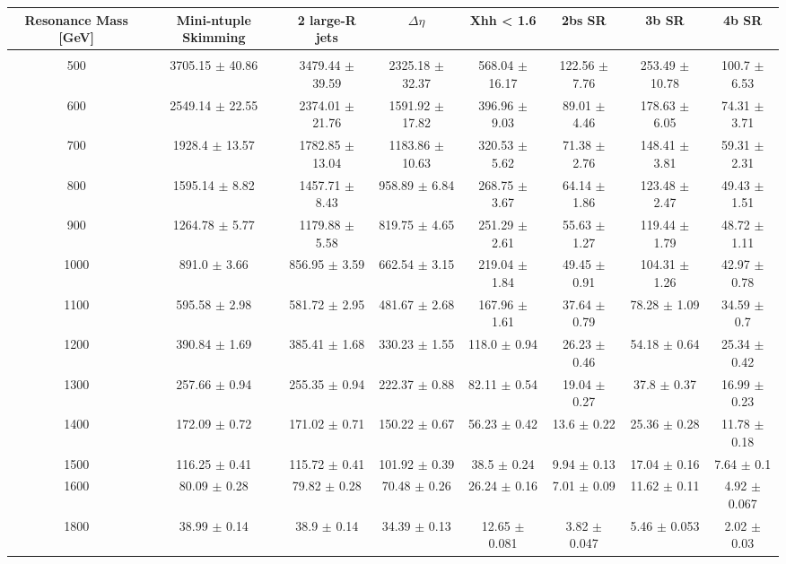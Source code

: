\begin{footnotesize} 
\begin{tabular}{c|c|c|c|c|c|c|c} 
Resonance Mass [GeV] & Mini-ntuple Skimming & 2 large-R jets & $\Delta\eta$ & Xhh < 1.6 & 2bs SR & 3b SR & 4b SR \\ 
\hline\hline 
& & & & & & &\\ 
500 & 3705.15 $\pm$ 40.86 & 3479.44 $\pm$ 39.59 & 2325.18 $\pm$ 32.37 & 568.04 $\pm$ 16.17 & 122.56 $\pm$ 7.76 & 253.49 $\pm$ 10.78 & 100.7 $\pm$ 6.53\\ 
600 & 2549.14 $\pm$ 22.55 & 2374.01 $\pm$ 21.76 & 1591.92 $\pm$ 17.82 & 396.96 $\pm$ 9.03 & 89.01 $\pm$ 4.46 & 178.63 $\pm$ 6.05 & 74.31 $\pm$ 3.71\\ 
700 & 1928.4 $\pm$ 13.57 & 1782.85 $\pm$ 13.04 & 1183.86 $\pm$ 10.63 & 320.53 $\pm$ 5.62 & 71.38 $\pm$ 2.76 & 148.41 $\pm$ 3.81 & 59.31 $\pm$ 2.31\\ 
800 & 1595.14 $\pm$ 8.82 & 1457.71 $\pm$ 8.43 & 958.89 $\pm$ 6.84 & 268.75 $\pm$ 3.67 & 64.14 $\pm$ 1.86 & 123.48 $\pm$ 2.47 & 49.43 $\pm$ 1.51\\ 
900 & 1264.78 $\pm$ 5.77 & 1179.88 $\pm$ 5.58 & 819.75 $\pm$ 4.65 & 251.29 $\pm$ 2.61 & 55.63 $\pm$ 1.27 & 119.44 $\pm$ 1.79 & 48.72 $\pm$ 1.11\\ 
1000 & 891.0 $\pm$ 3.66 & 856.95 $\pm$ 3.59 & 662.54 $\pm$ 3.15 & 219.04 $\pm$ 1.84 & 49.45 $\pm$ 0.91 & 104.31 $\pm$ 1.26 & 42.97 $\pm$ 0.78\\ 
1100 & 595.58 $\pm$ 2.98 & 581.72 $\pm$ 2.95 & 481.67 $\pm$ 2.68 & 167.96 $\pm$ 1.61 & 37.64 $\pm$ 0.79 & 78.28 $\pm$ 1.09 & 34.59 $\pm$ 0.7\\ 
1200 & 390.84 $\pm$ 1.69 & 385.41 $\pm$ 1.68 & 330.23 $\pm$ 1.55 & 118.0 $\pm$ 0.94 & 26.23 $\pm$ 0.46 & 54.18 $\pm$ 0.64 & 25.34 $\pm$ 0.42\\ 
1300 & 257.66 $\pm$ 0.94 & 255.35 $\pm$ 0.94 & 222.37 $\pm$ 0.88 & 82.11 $\pm$ 0.54 & 19.04 $\pm$ 0.27 & 37.8 $\pm$ 0.37 & 16.99 $\pm$ 0.23\\ 
1400 & 172.09 $\pm$ 0.72 & 171.02 $\pm$ 0.71 & 150.22 $\pm$ 0.67 & 56.23 $\pm$ 0.42 & 13.6 $\pm$ 0.22 & 25.36 $\pm$ 0.28 & 11.78 $\pm$ 0.18\\ 
1500 & 116.25 $\pm$ 0.41 & 115.72 $\pm$ 0.41 & 101.92 $\pm$ 0.39 & 38.5 $\pm$ 0.24 & 9.94 $\pm$ 0.13 & 17.04 $\pm$ 0.16 & 7.64 $\pm$ 0.1\\ 
1600 & 80.09 $\pm$ 0.28 & 79.82 $\pm$ 0.28 & 70.48 $\pm$ 0.26 & 26.24 $\pm$ 0.16 & 7.01 $\pm$ 0.09 & 11.62 $\pm$ 0.11 & 4.92 $\pm$ 0.067\\ 
1800 & 38.99 $\pm$ 0.14 & 38.9 $\pm$ 0.14 & 34.39 $\pm$ 0.13 & 12.65 $\pm$ 0.081 & 3.82 $\pm$ 0.047 & 5.46 $\pm$ 0.053 & 2.02 $\pm$ 0.03\\ 

\end{tabular}
\end{footnotesize}
